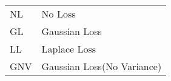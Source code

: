 \begin{tabular}{|l|p{2.25cm}|} 
    \hline
     NL  & No Loss           \\
     GL  & Gaussian Loss     \\
     LL  & Laplace Loss      \\
     GNV & Gaussian Loss\newline (No Variance)  \\
     \hline
\end{tabular}